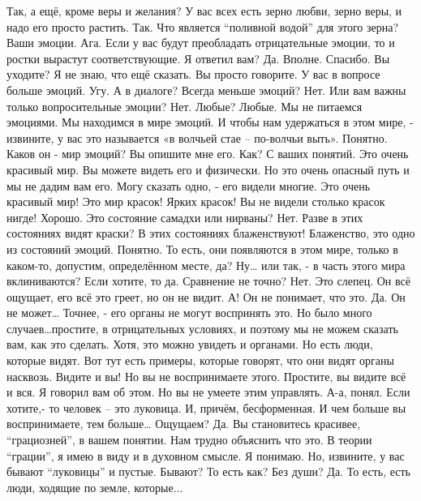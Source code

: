 \documentclass{extbook}
\newcommand{\soul}[1]{{#1}}
\newcommand{\people}[1]{{#1}}
\begin{document}
\people{Так, а  ещё, кроме веры  и желания? }
\soul{У вас всех есть зерно любви, зерно веры, и надо его просто растить.}
\people{Так. Что является ``поливной водой'' для  этого зерна?}
\soul{Ваши эмоции.}
\people{Ага.}
\soul{Если у вас будут преобладать отрицательные эмоции, то  и ростки вырастут соответствующие.   Я ответил вам?}
\people{Да.  Вполне. Спасибо.}
\soul{Вы уходите?}
\people{Я не знаю, что ещё сказать. }
\soul{Вы просто говорите. У вас в вопросе  больше эмоций.}
\people{Угу. А в диалоге?  Всегда меньше эмоций?}
\soul{Нет.}
\people{Или вам важны только вопросительные эмоции?}
\soul{Нет.}
\people{Любые?}
\soul{Любые. Мы не питаемся эмоциями. Мы находимся в мире эмоций. И чтобы нам удержаться в этом мире, - извините, у вас это называется «в волчьей стае – по-волчьи выть».}
\people{Понятно. Каков он - мир эмоций?  Вы опишите мне его.  Как? С ваших понятий.}
\soul{Это очень красивый мир. Вы можете видеть его и физически. Но  это очень опасный путь и мы не дадим вам его. Могу сказать одно, - его видели  многие. Это очень красивый мир! Это мир красок! Ярких красок! Вы не видели столько красок нигде!}
\people{Хорошо. Это состояние самадхи  или  нирваны?}
\soul{Нет. Разве в этих состояниях видят краски?}
\people{В этих состояниях  блаженствуют!}
\soul{ Блаженство, это одно из состояний эмоций.}
\people{Понятно. То есть, они появляются в этом мире, только в каком-то, допустим, определённом месте, да? Ну… или так, - в часть этого мира вклиниваются? }
\soul{Если хотите, то  да.}
\people{Сравнение  не точно?}
\soul{Нет. Это слепец. Он всё  ощущает, его всё это  греет, но он не видит.}
\people{А! Он не понимает, что это.}
\soul{Да. Он не может… Точнее, - его органы не могут воспринять это. Но было много случаев…простите, в отрицательных условиях, и поэтому мы не можем сказать вам, как  это сделать. Хотя, это можно увидеть и органами.}
\people{Но есть люди, которые видят. Вот тут есть примеры, которые говорят, что они видят органы насквозь.}
\soul{Видите и вы! Но вы не воспринимаете этого. Простите, вы видите всё и вся. Я говорил вам об этом. Но вы не умеете этим управлять.}
\people{А-а, понял. }
\soul{Если хотите,- то человек – это луковица. И, причём, бесформенная.  И чем больше вы воспринимаете, тем больше…}
\people{Ощущаем?}
\soul{Да. Вы становитесь красивее, ``грациозней'', в вашем понятии. Нам трудно объяснить что это.   В теории ``грации'', я имею в виду и в духовном смысле. }
\people{Я понимаю.}
\soul{Но, извините, у вас  бывают ``луковицы'' и пустые. }
\people{Бывают? То есть как? Без души? }
\soul{Да.}
\people{То есть, есть люди, ходящие по земле, которые... }
\end{document}

